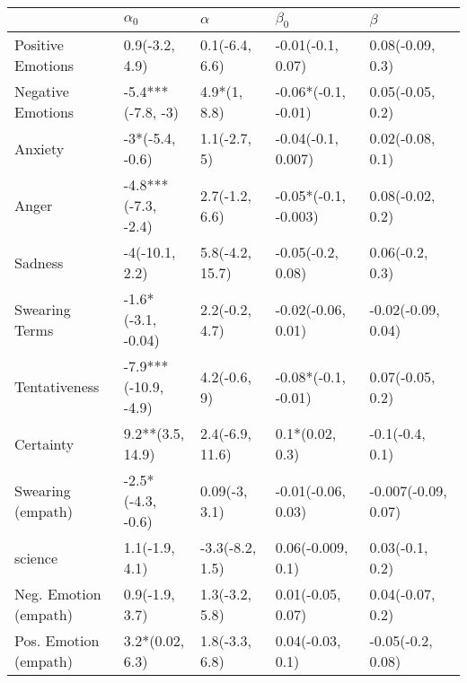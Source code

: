 \begin{tabular}{lllll}
\toprule
{} &            $\alpha_0$ &         $\alpha$ &             $\beta_0$ &              $\beta$ \\
\midrule
Positive Emotions     &        0.9(-3.2, 4.9) &   0.1(-6.4, 6.6) &     -0.01(-0.1, 0.07) &     0.08(-0.09, 0.3) \\
Negative Emotions     &     -5.4***(-7.8, -3) &     4.9*(1, 8.8) &   -0.06*(-0.1, -0.01) &     0.05(-0.05, 0.2) \\
Anxiety               &       -3*(-5.4, -0.6) &     1.1(-2.7, 5) &    -0.04(-0.1, 0.007) &     0.02(-0.08, 0.1) \\
Anger                 &   -4.8***(-7.3, -2.4) &   2.7(-1.2, 6.6) &  -0.05*(-0.1, -0.003) &     0.08(-0.02, 0.2) \\
Sadness               &        -4(-10.1, 2.2) &  5.8(-4.2, 15.7) &     -0.05(-0.2, 0.08) &      0.06(-0.2, 0.3) \\
Swearing Terms        &    -1.6*(-3.1, -0.04) &   2.2(-0.2, 4.7) &    -0.02(-0.06, 0.01) &   -0.02(-0.09, 0.04) \\
Tentativeness         &  -7.9***(-10.9, -4.9) &     4.2(-0.6, 9) &   -0.08*(-0.1, -0.01) &     0.07(-0.05, 0.2) \\
Certainty             &      9.2**(3.5, 14.9) &  2.4(-6.9, 11.6) &       0.1*(0.02, 0.3) &      -0.1(-0.4, 0.1) \\
Swearing (empath)     &     -2.5*(-4.3, -0.6) &    0.09(-3, 3.1) &    -0.01(-0.06, 0.03) &  -0.007(-0.09, 0.07) \\
science               &        1.1(-1.9, 4.1) &  -3.3(-8.2, 1.5) &     0.06(-0.009, 0.1) &      0.03(-0.1, 0.2) \\
Neg. Emotion (empath) &        0.9(-1.9, 3.7) &   1.3(-3.2, 5.8) &     0.01(-0.05, 0.07) &     0.04(-0.07, 0.2) \\
Pos. Emotion (empath) &       3.2*(0.02, 6.3) &   1.8(-3.3, 6.8) &      0.04(-0.03, 0.1) &    -0.05(-0.2, 0.08) \\
\bottomrule
\end{tabular}
